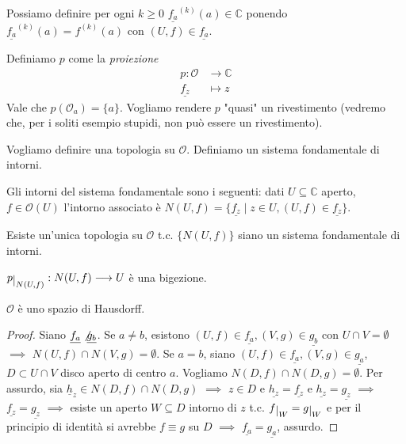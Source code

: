 \begin{oss}
  Possiamo definire per ogni $k \ge 0$ $\underline{f_a}^{(k)}(a) \in \mathbb{C}$ ponendo $\underline{f_a}^{(k)}(a)=f^{(k)}(a)$ con $(U, f) \in \underline{f_a}$.
\end{oss}

\begin{defn}
  Definiamo $p$ come la \textit{proiezione}
  \begin{align*}
    p: \mathcal{O} &\longrightarrow \mathbb{C}\\
    \underline{f_z} &\longmapsto z
  \end{align*}
  Vale che $p(\mathcal{O}_a)=\{a\}$. Vogliamo rendere $p$ "quasi" un rivestimento (vedremo che, per i soliti esempio stupidi, non può essere un rivestimento).
\end{defn}

Vogliamo definire una topologia su $\mathcal{O}$. Definiamo un sistema fondamentale di intorni.

\begin{defn}
  Gli intorni del sistema fondamentale sono i seguenti: dati $U \subseteq \mathbb{C}$ aperto, $f \in \mathcal{O}(U)$ l'intorno associato è $N(U, f)=\{\underline{f_z} \mid z \in U, (U, f) \in \underline{f_z}\}$.
\end{defn}

\begin{exc}
  Esiste un'unica topologia su $\mathcal{O}$ t.c. $\{N(U, f)\}$ siano un sistema fondamentale di intorni.
\end{exc}

\begin{oss}
  $p\restrict{N(U, f)}:N(U, f) \longrightarrow U$ è una bigezione.
\end{oss}

\begin{prop}
  $\mathcal{O}$ è uno spazio di Hausdorff.
\end{prop}

\begin{proof}
  Siano $\underline{f_a} \not \underline{g_b}$. Se $a \not= b$, esistono $(U, f) \in \underline{f_a}, (V, g) \in \underline{g_b}$ con $U \cap V=\emptyset$ $\implies$ $N(U, f) \cap N(V, g)=\emptyset$.
  Se $a=b$, siano $(U, f) \in \underline{f_a}, (V, g) \in \underline{g_a}$, $D \subset U \cap V$ disco aperto di centro $a$. Vogliamo $N(D, f) \cap N(D, g)=\emptyset$.
  Per assurdo, sia $\underline{h}_z \in N(D, f) \cap N(D, g)$ $\implies$ $z \in D$ e $\underline{h_z}=\underline{f_z}$ e $\underline{h_z}=\underline{g_z}$ $\implies$ $\underline{f_z}=\underline{g_z}$ $\implies$ esiste un aperto $W \subseteq D$ intorno di $z$ t.c. $f\restrict{W}=g\restrict{W}$ e per il principio di identità si avrebbe $f \equiv g$ su $D$ $\implies$ $\underline{f_a}=\underline{g_a}$, assurdo.
\end{proof}

